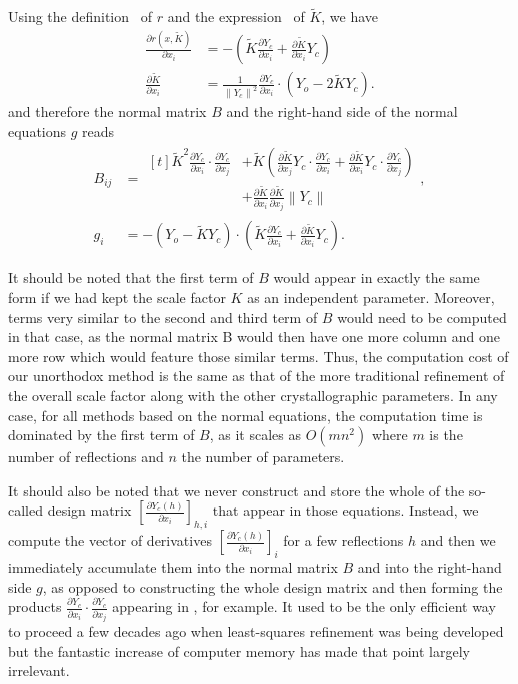 \documentclass[11pt]{article}
\newcommand{\norm}[1]{\left\| #1 \right\|}
\DeclareMathOperator{\dotprod}{\cdot}
\newcommand{\partialder}[2]{\frac{\partial #1}{\partial #2}}
\begin{document}
Using the definition~ of $r$ and the expression~ of $\tilde{K}$, we have
\begin{align}
\partialder{r(x, \tilde{K})}{x_i} &= -\left( \tilde{K}\partialder{Y_c}{x_i} + \partialder{\tilde{K}}{x_i} Y_c \right) \\
\partialder{\tilde{K}}{x_i} &= \frac{1}{\norm{Y_c}^2}\partialder{Y_c}{x_i} \dotprod \left(Y_o - 2 \tilde{K}Y_c \right).
\end{align}
and therefore the normal matrix $B$ and the right-hand side of the normal equations $g$ reads
\begin{align}
B_{ij} &= \begin{aligned}[t] \tilde{K}^2\partialder{Y_c}{x_i} \dotprod \partialder{Y_c}{x_j} 
&+ \tilde{K} \left( \partialder{\tilde{K}}{x_j}Y_c \dotprod \partialder{Y_c}{x_i}
+ \partialder{\tilde{K}}{x_i}Y_c \dotprod \partialder{Y_c}{x_j} \right) \nonumber\\
&+ \partialder{\tilde{K}}{x_i}\partialder{\tilde{K}}{x_j} \norm{Y_c}
\end{aligned},
\label{eqn:normalmatrixwithoutscalefactor} \\
g_i &= - (Y_o - \tilde{K}Y_c) \dotprod \left( \tilde{K}\partialder{Y_c}{x_i} + \partialder{\tilde{K}}{x_i} Y_c \right).
\end{align}

It should be noted that the first term of $B$ would appear in exactly the same form if we had kept the scale factor $K$ as an independent parameter. Moreover, terms very similar to the second and third term of $B$ would need to be computed in that case, as the normal matrix B would then have one more column and one more row which would feature those similar terms. Thus, the computation cost of our unorthodox method is the same as that of the more traditional refinement of the overall scale factor along with the other crystallographic parameters. In any case, for all methods based on the normal equations, the computation time is dominated by the first term of $B$, as it scales as $O(mn^2)$ where $m$ is the number of reflections and $n$ the number of parameters.

It should also be noted that we never construct and store the whole of the so-called design matrix $\left[ \partialder{Y_c(h)}{x_i} \right]_{h,i}$ that appear in those equations. Instead, we compute the vector of derivatives $\left[ \partialder{Y_c(h)}{x_i} \right]_i$ for a few reflections $h$ and then we immediately accumulate them into the normal matrix $B$ and into the right-hand side $g$, as opposed to constructing the whole design matrix and then forming the products $\partialder{Y_c}{x_i} \dotprod \partialder{Y_c}{x_j}$ appearing in , for example. It used to be the only efficient way to proceed a few decades ago when least-squares refinement was being developed but the fantastic increase of computer memory has made that point largely irrelevant.
\end{document}
